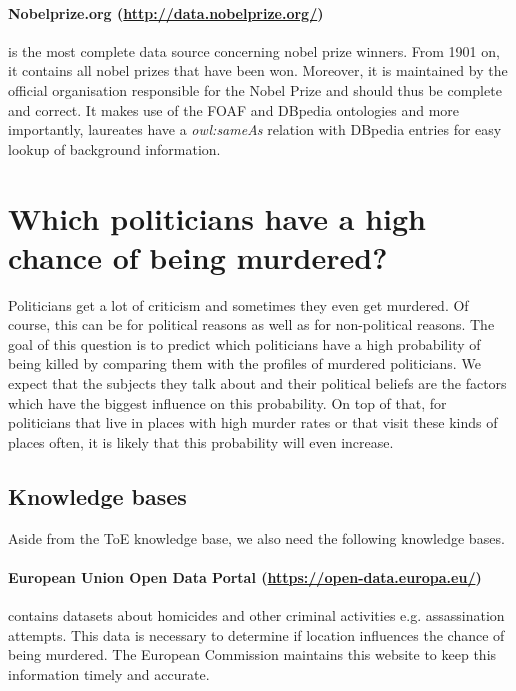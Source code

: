 \documentclass[12pt,a4paper]{article}
\begin{document}
\paragraph{\textbf{Nobelprize.org} (\url{http://data.nobelprize.org/})} is the most complete data source concerning nobel prize winners. From 1901 on, it contains all nobel prizes that have been won. Moreover, it is maintained by the official organisation responsible for the Nobel Prize and should thus be complete and correct. It makes use of the FOAF and DBpedia ontologies and more importantly, laureates have a \emph{owl:sameAs} relation with DBpedia entries for easy lookup of background information.
 

\section{ Which politicians have a high chance of being murdered?}

Politicians get a lot of criticism and sometimes they even get murdered. Of course, this can be for political reasons as well as for non-political reasons. The goal of this question is to predict which politicians have a high probability of being killed by comparing them with the profiles of murdered politicians. We expect that the subjects they talk about and their political beliefs are the factors which have the biggest influence on this probability. On top of that, for politicians that live in places with high murder rates or that visit these kinds of places often, it is likely that this probability will even increase.

\subsection*{Knowledge bases}

Aside from the ToE knowledge base, we also need the following knowledge bases.

\paragraph{\textbf{European Union Open Data Portal} (\url{https://open-data.europa.eu/})} contains datasets about homicides and other criminal activities e.g. assassination attempts. This data is necessary to determine if location influences the chance of being murdered. The European Commission maintains this website to keep this information timely and accurate.
\end{document}
